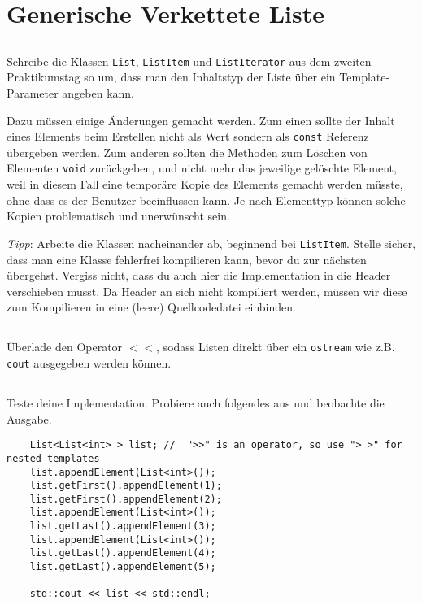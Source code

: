 \section{Generische Verkettete Liste}
\label{sec:list}
\subsection{}
Schreibe die Klassen \texttt{List}, \texttt{ListItem} und \texttt{ListIterator} aus dem zweiten Praktikumstag so um, dass man den Inhaltstyp der Liste über ein Template-Parameter angeben kann.

Dazu müssen einige Änderungen gemacht werden.
Zum einen sollte der Inhalt eines Elements beim Erstellen nicht als Wert sondern als \texttt{const} Referenz übergeben werden.
Zum anderen sollten die Methoden zum Löschen von Elementen \texttt{void} zurückgeben, und nicht mehr das jeweilige gelöschte Element, weil in diesem Fall eine temporäre Kopie des Elements gemacht werden müsste, ohne dass es der Benutzer beeinflussen kann.
Je nach Elementtyp können solche Kopien problematisch und unerwünscht sein.

\emph{Tipp}: Arbeite die Klassen nacheinander ab, beginnend bei \texttt{ListItem}.
Stelle sicher, dass man eine Klasse fehlerfrei kompilieren kann, bevor du zur nächsten übergehst.
Vergiss nicht, dass du auch hier die Implementation in die Header verschieben musst.
Da Header an sich nicht kompiliert werden, müssen wir diese zum Kompilieren in eine (leere) Quellcodedatei einbinden.

\subsection{}
Überlade den Operator $<<$, sodass Listen direkt über ein \texttt{ostream} wie z.B. \texttt{cout} ausgegeben werden können.

\subsection{}
Teste deine Implementation. Probiere auch folgendes aus und beobachte die Ausgabe.

\begin{lstlisting}
	List<List<int> > list; //  ">>" is an operator, so use "> >" for nested templates
	list.appendElement(List<int>());
	list.getFirst().appendElement(1);
	list.getFirst().appendElement(2);
	list.appendElement(List<int>());
	list.getLast().appendElement(3);
	list.appendElement(List<int>());
	list.getLast().appendElement(4);
	list.getLast().appendElement(5);
	
	std::cout << list << std::endl;
\end{lstlisting}
